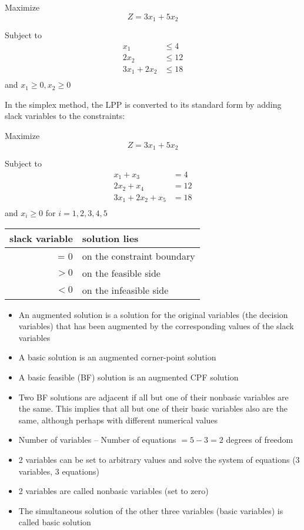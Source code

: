 \documentclass[12pt]{article}
\begin{document}
Maximize $$Z=3 x_1 + 5 x_2$$

Subject to 
\begin{align*}
x_1           & \le 4  \\
2 x_2         & \le 12 \\
3 x_1 + 2 x_2 & \le 18 \\
\end{align*}
and 
$x_1 \ge 0, x_2 \ge 0$

In the simplex method, the LPP is converted to its standard form by adding slack variables to the constraints:

Maximize $$Z=3 x_1 + 5 x_2$$

Subject to 
\begin{align*}
x_1 +x_3& = 4   \\
2 x_2 +x_4& = 12 \\
3 x_1 + 2 x_2+x_5 & = 18 \\
\end{align*}
and 
$x_i \ge 0$ for $i=1,2,3,4,5$

\begin{tabular}{r|l}
  slack variable & solution lies              \\ \hline
  = 0            & on the constraint boundary \\
  $>0$           & on the feasible side       \\ 
  $<0$           & on the infeasible side
\end{tabular}



  \begin{itemize}
  \item An augmented solution is a solution for the original variables (the decision variables) that has been augmented by the corresponding values of the slack variables
  \item A basic solution is an augmented corner-point solution
  \item A basic feasible (BF) solution is an augmented CPF solution
  \item Two BF solutions are adjacent if all but one of their nonbasic variables are the same.
This implies that all but one of their basic variables also are the same, although perhaps
with different numerical values
  \end{itemize}


  \begin{itemize}
\item Number of variables -- Number of equations $= 5-3=2$ degrees of freedom
\item 2 variables can be set to arbitrary values and solve the system of equations (3 variables, 3 equations)
  \item 2 variables are called nonbasic variables (set to zero)
  \item The simultaneous solution of the other three variables (basic variables) is called basic solution
  \end{itemize}
\end{document}
